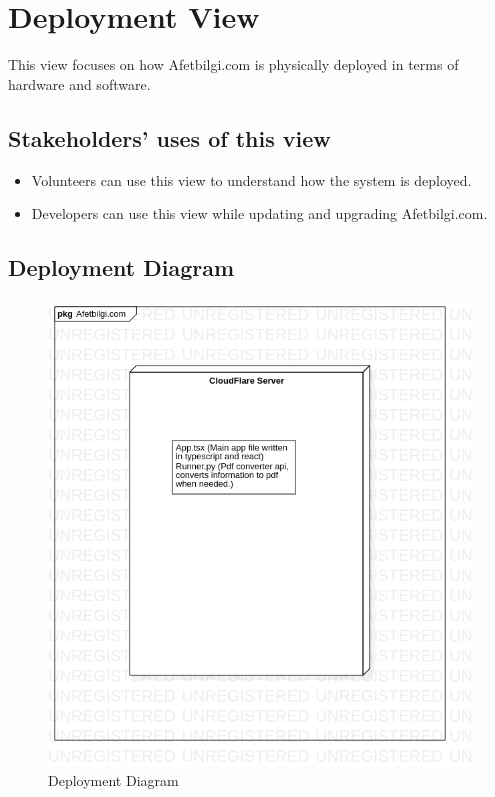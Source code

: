 \section{Deployment View}
This view focuses on how Afetbilgi.com is physically deployed in terms of hardware and software.

\subsection{Stakeholders' uses of this view}
\begin{itemize}
    \item Volunteers can use this view to understand how the system is deployed.
    \item Developers can use this view while updating and upgrading Afetbilgi.com.
\end{itemize}

\subsection{Deployment Diagram}
\begin{figure}[H]
    \includegraphics[scale = 0.5]{assets/DeploymentDiagram1.png}
    \caption[Deployment Diagram]{Deployment Diagram}
\end{figure}

